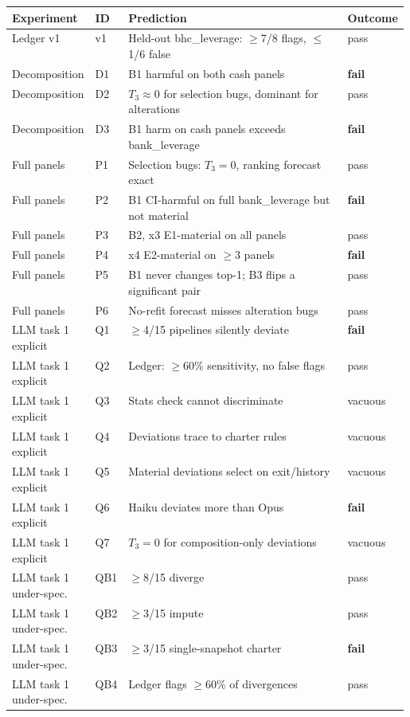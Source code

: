 \begin{longtable}{llp{0.58\linewidth}l}
\toprule
Experiment & ID & Prediction & Outcome \\
\midrule
\endhead
Ledger v1 & v1 & Held-out bhc\_leverage: $\ge$7/8 flags, $\le$1/6 false & pass \\
Decomposition & D1 & B1 harmful on both cash panels & \textbf{fail} \\
Decomposition & D2 & $T_3\approx0$ for selection bugs, dominant for alterations & pass \\
Decomposition & D3 & B1 harm on cash panels exceeds bank\_leverage & \textbf{fail} \\
Full panels & P1 & Selection bugs: $T_3=0$, ranking forecast exact & pass \\
Full panels & P2 & B1 CI-harmful on full bank\_leverage but not material & \textbf{fail} \\
Full panels & P3 & B2, x3 E1-material on all panels & pass \\
Full panels & P4 & x4 E2-material on $\ge$3 panels & \textbf{fail} \\
Full panels & P5 & B1 never changes top-1; B3 flips a significant pair & pass \\
Full panels & P6 & No-refit forecast misses alteration bugs & pass \\
LLM task 1 explicit & Q1 & $\ge$4/15 pipelines silently deviate & \textbf{fail} \\
LLM task 1 explicit & Q2 & Ledger: $\ge$60\% sensitivity, no false flags & pass \\
LLM task 1 explicit & Q3 & Stats check cannot discriminate & vacuous \\
LLM task 1 explicit & Q4 & Deviations trace to charter rules & vacuous \\
LLM task 1 explicit & Q5 & Material deviations select on exit/history & vacuous \\
LLM task 1 explicit & Q6 & Haiku deviates more than Opus & \textbf{fail} \\
LLM task 1 explicit & Q7 & $T_3=0$ for composition-only deviations & vacuous \\
LLM task 1 under-spec. & QB1 & $\ge$8/15 diverge & pass \\
LLM task 1 under-spec. & QB2 & $\ge$3/15 impute & pass \\
LLM task 1 under-spec. & QB3 & $\ge$3/15 single-snapshot charter & \textbf{fail} \\
LLM task 1 under-spec. & QB4 & Ledger flags $\ge$60\% of divergences & pass \\

\end{longtable}
